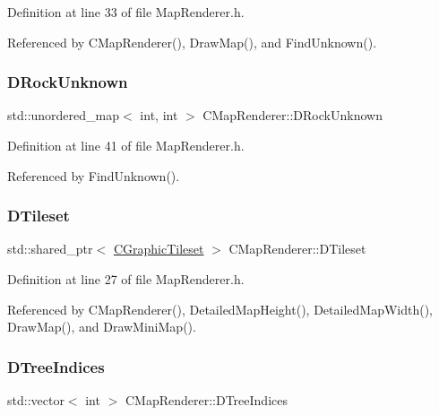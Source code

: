 Definition at line 33 of file Map\+Renderer.\+h.



Referenced by C\+Map\+Renderer(), Draw\+Map(), and Find\+Unknown().

\hypertarget{classCMapRenderer_a28aa9c33d5d2eeae0ef7c23e59712274}{}\label{classCMapRenderer_a28aa9c33d5d2eeae0ef7c23e59712274} 
\subsubsection{\texorpdfstring{D\+Rock\+Unknown}{DRockUnknown}}
{\footnotesize\ttfamily std\+::unordered\+\_\+map$<$ int, int $>$ C\+Map\+Renderer\+::\+D\+Rock\+Unknown\hspace{0.3cm}{\ttfamily [protected]}}



Definition at line 41 of file Map\+Renderer.\+h.



Referenced by Find\+Unknown().

\hypertarget{classCMapRenderer_ace0648cba050b5e02431096edd15b836}{}\label{classCMapRenderer_ace0648cba050b5e02431096edd15b836} 
\subsubsection{\texorpdfstring{D\+Tileset}{DTileset}}
{\footnotesize\ttfamily std\+::shared\+\_\+ptr$<$ \hyperlink{classCGraphicTileset}{C\+Graphic\+Tileset} $>$ C\+Map\+Renderer\+::\+D\+Tileset\hspace{0.3cm}{\ttfamily [protected]}}



Definition at line 27 of file Map\+Renderer.\+h.



Referenced by C\+Map\+Renderer(), Detailed\+Map\+Height(), Detailed\+Map\+Width(), Draw\+Map(), and Draw\+Mini\+Map().

\hypertarget{classCMapRenderer_a56708493a1499c671f4378204a0bfcb2}{}\label{classCMapRenderer_a56708493a1499c671f4378204a0bfcb2} 
\subsubsection{\texorpdfstring{D\+Tree\+Indices}{DTreeIndices}}
{\footnotesize\ttfamily std\+::vector$<$ int $>$ C\+Map\+Renderer\+::\+D\+Tree\+Indices\hspace{0.3cm}{\ttfamily [protected]}}



